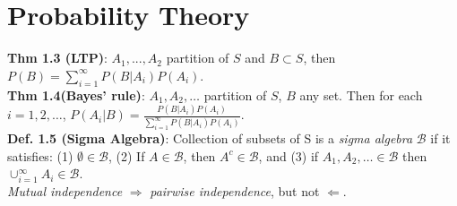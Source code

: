\section{Probability Theory}
\textbf{Thm 1.3 (LTP)}: $A_1, ..., A_2$ partition of $S$ and $B\subset S$, then $P(B) = \sum_{i=1}^\infty P(B|A_i)P(A_i)$.\\
\textbf{Thm 1.4(Bayes' rule)}: $A_1, A_2, \ldots$ partition of $S$, $B$ any set. Then for each $i=1,2,\ldots$, $P(A_i|B) = \frac{P(B|A_i)P(A_i)}{\sum_{i=1}^\infty P(B|A_i)P(A_i)}$.\\
\textbf{Def. 1.5 (Sigma Algebra)}: Collection of subsets of S is a \textit{sigma algebra} $\mathcal{B}$ if it satisfies: (1) $\emptyset\in\mathcal{B}$, (2) If $A\in\mathcal{B}$, then $A^c\in\mathcal{B}$, and (3) if $A_1, A_2, \ldots \in\mathcal{B}$ then $\cup_{i=1}^\infty A_i\in\mathcal{B}$.\\
\textit{Mutual independence} $\Rightarrow$ \textit{pairwise independence}, but not $\Leftarrow$.
